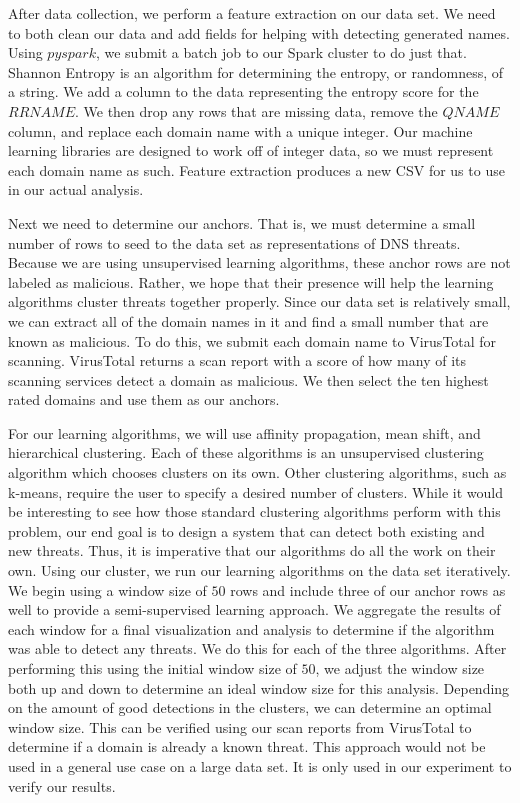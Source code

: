 After data collection, we perform a feature extraction on our data set.
We need to both clean our data and add fields for helping with detecting generated names.
Using $pyspark$, we submit a batch job to our Spark cluster to do just that.
Shannon Entropy is an algorithm for determining the entropy, or randomness, of a string.
We add a column to the data representing the entropy score for the $RRNAME$.
We then drop any rows that are missing data, remove the $QNAME$ column, and replace each domain name
with a unique integer.
Our machine learning libraries are designed to work off of integer data, so we must represent each
domain name as such.
Feature extraction produces a new CSV for us to use in our actual analysis.

Next we need to determine our anchors.
That is, we must determine a small number of rows to seed to the data set as representations of
DNS threats.
Because we are using unsupervised learning algorithms, these anchor rows are not labeled as malicious.
Rather, we hope that their presence will help the learning algorithms cluster threats together properly.
Since our data set is relatively small, we can extract all of the domain names in it and find
a small number that are known as malicious.
To do this, we submit each domain name to VirusTotal for scanning.
VirusTotal returns a scan report with a score of how many of its scanning services detect a domain
as malicious.
We then select the ten highest rated domains and use them as our anchors.

For our learning algorithms, we will use affinity propagation, mean shift, and hierarchical clustering.
Each of these algorithms is an unsupervised clustering algorithm which chooses clusters on its own.
Other clustering algorithms, such as k-means, require the user to specify a desired number of clusters.
While it would be interesting to see how those standard clustering algorithms perform with this problem,
our end goal is to design a system that can detect both existing and new threats.
Thus, it is imperative that our algorithms do all the work on their own.
Using our cluster, we run our learning algorithms on the data set iteratively.
We begin using a window size of $50$ rows and include three of our anchor rows as well to provide
a semi-supervised learning approach.
We aggregate the results of each window for a final visualization and analysis to determine if
the algorithm was able to detect any threats.
We do this for each of the three algorithms.
After performing this using the initial window size of $50$, we adjust the window size both up and
down to determine an ideal window size for this analysis.
Depending on the amount of good detections in the clusters, we can determine an optimal window size.
This can be verified using our scan reports from VirusTotal to determine if a domain is already a
known threat.
This approach would not be used in a general use case on a large data set.
It is only used in our experiment to verify our results.
